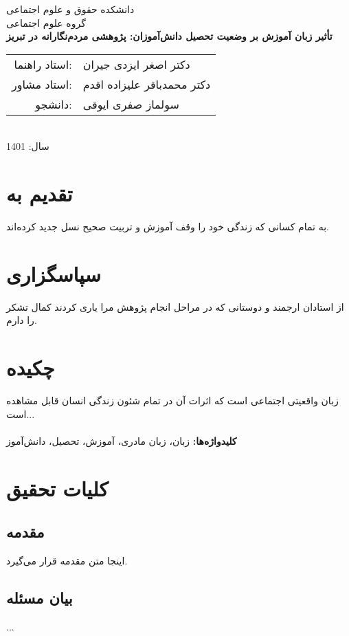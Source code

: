 \documentclass[12pt,a4paper]{report}
\newcommand{\university}{دانشکده حقوق و علوم اجتماعی}
\newcommand{\faculty}{گروه علوم اجتماعی}
\newcommand{\titlefa}{تأثیر زبان آموزش بر وضعیت تحصیل دانش‌آموزان: پژوهشی مردم‌نگارانه در تبریز}
\newcommand{\authorfa}{سولماز صفری ایوقی}
\newcommand{\supervisor}{دکتر اصغر ایزدی جیران}
\newcommand{\advisor}{دکتر محمدباقر علیزاده اقدم}
\newcommand{\year}{1401}
\begin{document}
\begin{titlepage}
\centering
{\Large \university \\[0.5cm]}
{\Large \faculty \\[2cm]}
{\Huge \textbf{\titlefa} \\[2cm]}
\begin{tabular}{rl}
  استاد راهنما: & \supervisor \\
  استاد مشاور: & \advisor \\
  دانشجو: & \authorfa \\
\end{tabular}\\[2cm]
{\Large سال: \year}
\end{titlepage}


\chapter*{تقدیم به}
به تمام کسانی که زندگی خود را وقف آموزش و تربیت صحیح نسل جدید کرده‌اند.

\chapter*{سپاسگزاری}
از استادان ارجمند و دوستانی که در مراحل انجام پژوهش مرا یاری کردند کمال تشکر را دارم.

\chapter*{چکیده}
زبان واقعیتی اجتماعی است که اثرات آن در تمام شئون زندگی انسان قابل مشاهده است... \\
\\
\textbf{کلیدواژه‌ها:} زبان، زبان مادری، آموزش، تحصیل، دانش‌آموز

\newpage

\tableofcontents
\listoffigures
\listoftables

\newpage
{}

\chapter{کلیات تحقیق}
\section{مقدمه}
اینجا متن مقدمه قرار می‌گیرد.

\section{بیان مسئله}
...
\end{document}
